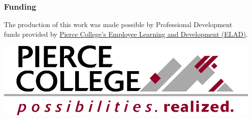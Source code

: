\subsubsection{Funding}

The production of this work was made possible by Professional Development funds provided by \href{https://www.pierce.ctc.edu/elad}{Pierce College's Employee Learning and Development (ELAD)}. 


\includegraphics{marcom-PierceCollege-Logo.png}



\bigskip
